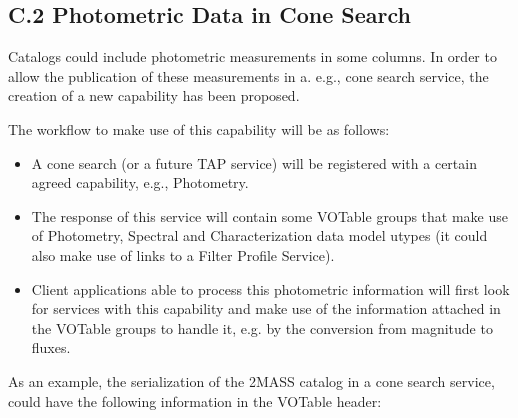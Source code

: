 \documentclass[11pt,a4paper]{ivoa}
\begin{document}
\subsection{C.2 Photometric Data in Cone Search}
Catalogs could include photometric measurements in some columns. In order to allow the publication of these measurements in a. e.g., cone search service, the creation of a new capability has been proposed. 
\par

The workflow to make use of this capability will be as follows:
\par

\begin{itemize}
	\item A cone search (or a future TAP service) will be registered with a certain agreed capability, e.g., Photometry.\par

	\item The response of this service will contain some VOTable groups that make use of Photometry, Spectral and Characterization data model utypes (it could also make use of links to a Filter Profile Service).\par

	\item Client applications able to process this photometric information will first look for services with this capability and make use of the information attached in the VOTable groups to handle it, e.g. by the conversion from magnitude to fluxes. 
\end{itemize}\par

As an example, the serialization of the 2MASS catalog in a cone search service, could have the following information in the VOTable header:
\par
\end{document}
